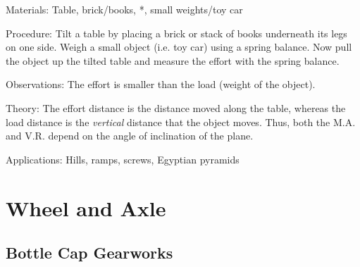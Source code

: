 \begin{multicols}{2}
\begin{description*}
\item[Materials:]{Table, brick/books, *, small weights/toy car}
\item[Procedure:]{Tilt a table by placing a brick or stack of books underneath its legs on one side. Weigh a small object (i.e. toy car) using a spring balance. Now pull the object up the tilted table and measure the effort with the spring balance.}
\item[Observations:]{The effort is smaller than the load (weight of the object).}
\item[Theory:]{The effort distance is the distance moved along the table, whereas the load distance is the \emph{vertical} distance that the object moves. Thus, both the M.A. and V.R. depend on the angle of inclination of the plane.}
\item[Applications:]{Hills, ramps, screws, Egyptian pyramids}
\end{description*}


\section*{Wheel and Axle}


\subsection{Bottle Cap Gearworks}



\end{multicols}
